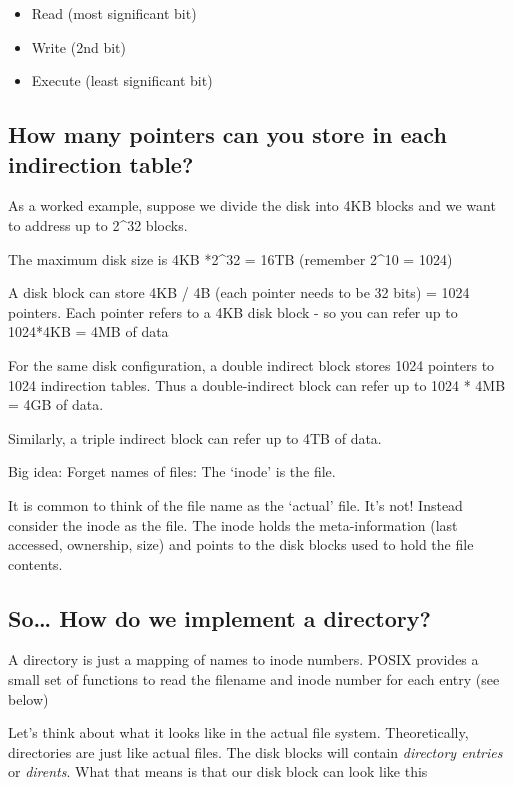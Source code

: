 \begin{itemize}
\tightlist
\item
  Read (most significant bit)\\
\item
  Write (2nd bit)\\
\item
  Execute (least significant bit)
\end{itemize}


\subsection{How many pointers can you store in each indirection table?}\label{how-many-pointers-can-you-store-in-each-indirection-table}

As a worked example, suppose we divide the disk into 4KB blocks and we want to address up to 2\^{}32 blocks.

The maximum disk size is 4KB *2\^{}32 = 16TB (remember 2\^{}10 = 1024)

A disk block can store 4KB / 4B (each pointer needs to be 32 bits) = 1024 pointers. Each pointer refers to a 4KB disk block - so you can refer up to 1024*4KB = 4MB of data

For the same disk configuration, a double indirect block stores 1024 pointers to 1024 indirection tables. Thus a double-indirect block can refer up to 1024 * 4MB = 4GB of data.

Similarly, a triple indirect block can refer up to 4TB of data.

Big idea: Forget names of files: The `inode' is the file.

It is common to think of the file name as the `actual' file. It's not! Instead consider the inode as the file. The inode holds the meta-information (last accessed, ownership, size) and points to the disk blocks used to hold the file contents.

\subsection{So\ldots{} How do we implement a directory?}\label{so-how-do-we-implement-a-directory}

A directory is just a mapping of names to inode numbers. POSIX provides a small set of functions to read the filename and inode number for each entry (see below)

Let's think about what it looks like in the actual file system. Theoretically, directories are just like actual files. The disk blocks will contain \emph{directory entries} or \emph{dirents}. What that means is that our disk block can look like this

